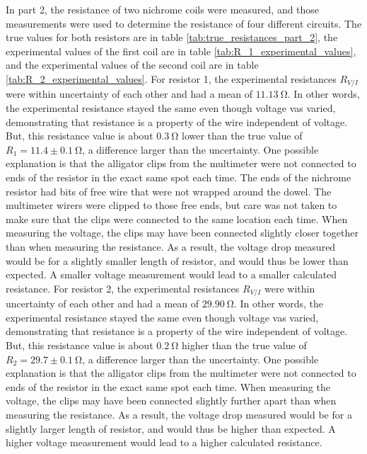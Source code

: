 \documentclass[12pt]{iopart} %
\gdef\units#1{~\mathrm{#1}}
\begin{document}
In part 2, the resistance of two nichrome coils were measured, and those measurements were used to determine the resistance of four different circuits.
The true values for both resistors are in table \ref{tab:true_resistances_part_2}, the experimental values of the first coil are in table \ref{tab:R_1_experimental_values}, and the experimental values of the second coil are in table \ref{tab:R_2_experimental_values}.
For resistor 1, the experimental resistances $R_{V/I}$ were within uncertainty of each other and had a mean of $11.13 \units{\Omega}$.
In other words, the experimental resistance stayed the same even though voltage vas varied, demonstrating that resistance is a property of the wire independent of voltage.
But, this resistance value is about $0.3 \units{\Omega}$ lower than the true value of $R_1 = 11.4 \pm 0.1 \units{\Omega}$, a difference larger than the uncertainty.
One possible explanation is that the alligator clips from the multimeter were not connected to ends of the resistor in the exact same spot each time.
The ends of the nichrome resistor had bits of free wire that were not wrapped around the dowel.
The multimeter wirers were clipped to those free ends, but care was not taken to make sure that the clips were connected to the same location each time.
When measuring the voltage, the clips may have been connected slightly closer together than when measuring the resistance.
As a result, the voltage drop measured would be for a slightly smaller length of resistor, and would thus be lower than expected.
A smaller voltage measurement would lead to a smaller calculated resistance.
For resistor 2, the experimental resistances $R_{V/I}$ were within uncertainty of each other and had a mean of $29.90 \units{\Omega}$.
In other words, the experimental resistance stayed the same even though voltage vas varied, demonstrating that resistance is a property of the wire independent of voltage.
But, this resistance value is about $0.2 \units{\Omega}$ higher than the true value of $R_2 = 29.7 \pm 0.1 \units{\Omega}$, a difference larger than the uncertainty.
One possible explanation is that the alligator clips from the multimeter were not connected to ends of the resistor in the exact same spot each time.
When measuring the voltage, the clips may have been connected slightly further apart than when measuring the resistance.
As a result, the voltage drop measured would be for a slightly larger length of resistor, and would thus be higher than expected.
A higher voltage measurement would lead to a higher calculated resistance.
\end{document}

